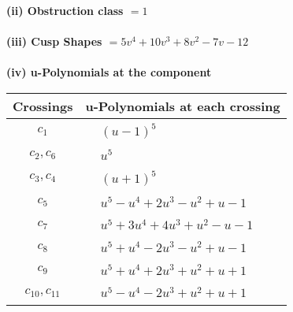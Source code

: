 \documentclass[1p]{elsarticle_modified}
\theoremstyle{definition}
\begin{document}
\flushleft \textbf{(ii) Obstruction class $= 1$}\\~\\
\flushleft \textbf{(iii) Cusp Shapes $= 5 v^4+10 v^3+8 v^2-7 v-12$}\\~\\
\newpage\renewcommand{\arraystretch}{1}
\flushleft \textbf{(iv) u-Polynomials at the component}\newline \\
\begin{tabular}{m{50pt}|m{274pt}}
Crossings & \hspace{64pt}u-Polynomials at each crossing \\
\hline $$\begin{aligned}c_{1}\end{aligned}$$&$\begin{aligned}
&(u-1)^5
\end{aligned}$\\
\hline $$\begin{aligned}c_{2},c_{6}\end{aligned}$$&$\begin{aligned}
&u^5
\end{aligned}$\\
\hline $$\begin{aligned}c_{3},c_{4}\end{aligned}$$&$\begin{aligned}
&(u+1)^5
\end{aligned}$\\
\hline $$\begin{aligned}c_{5}\end{aligned}$$&$\begin{aligned}
&u^5- u^4+2 u^3- u^2+u-1
\end{aligned}$\\
\hline $$\begin{aligned}c_{7}\end{aligned}$$&$\begin{aligned}
&u^5+3 u^4+4 u^3+u^2- u-1
\end{aligned}$\\
\hline $$\begin{aligned}c_{8}\end{aligned}$$&$\begin{aligned}
&u^5+u^4-2 u^3- u^2+u-1
\end{aligned}$\\
\hline $$\begin{aligned}c_{9}\end{aligned}$$&$\begin{aligned}
&u^5+u^4+2 u^3+u^2+u+1
\end{aligned}$\\
\hline $$\begin{aligned}c_{10},c_{11}\end{aligned}$$&$\begin{aligned}
&u^5- u^4-2 u^3+u^2+u+1
\end{aligned}$\\
\hline
\end{tabular}\\~\\
\end{document}
